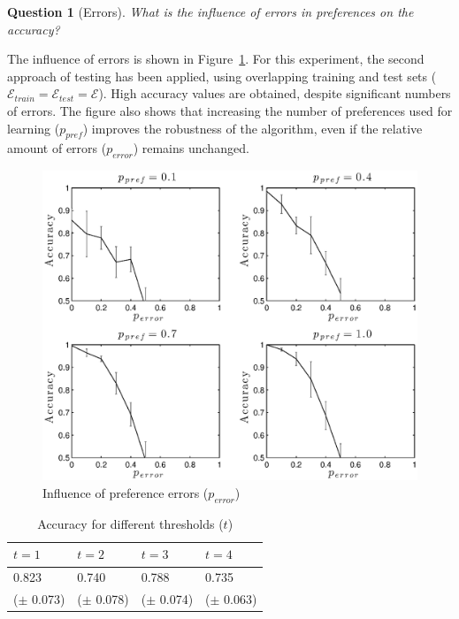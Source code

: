 \documentclass[letterpaper]{article}
\newcommand{\sym}[1]{\ensuremath{\mathcal{#1}}}
\newtheorem{question}{Question}
\theoremstyle{definition}
\begin{document}
\begin{question}[Errors]
  What is the influence of errors in preferences on the accuracy?
\end{question}

The influence of errors is shown in Figure~\ref{fig:ruis}.
For this experiment, the second approach of testing has been applied, using overlapping training and test sets ($\sym{E}_{train} = \sym{E}_{test} = \sym{E}$).
High accuracy values are obtained, despite significant numbers of errors.
The figure also shows that increasing the number of preferences used for learning ($p_{pref}$) improves the robustness of the algorithm, even if the relative amount of errors ($p_{error}$) remains unchanged.

\begin{figure}
  \centering
    \includegraphics[width=1\linewidth]{errors}
  \caption{Influence of preference errors ($p_{error}$)}
  \label{fig:ruis}
\end{figure}

  \begin{table}[!htp]
    \caption{Accuracy for different thresholds ($t$)}
    \begin{tabularx}{\linewidth}{XXXX}
      $t = 1$ & $t = 2$ & $t = 3$ & $t = 4$ \\
      \toprule
     0.823 & 0.740 & 0.788 & 0.735 \\
     ($\pm$ 0.073) & ($\pm$ 0.078) & ($\pm$ 0.074) & ($\pm$ 0.063)
    \end{tabularx}
    \label{tbl:limiet}
  \end{table}
\end{document}
